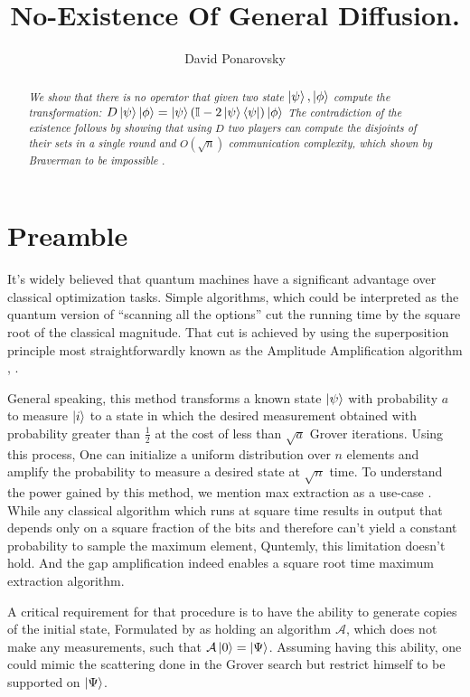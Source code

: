 \documentclass{article}
\begin{document}
\title{No-Existence Of General Diffusion.}
\author{David Ponarovsky}
\maketitle

\begin{abstract}\textit{We show that there is no operator that given two state $\ket{\psi},\ket{\phi}$ compute the transformation: $D \ket{\psi}\ket{\phi} = \ket{\psi}\left( \mathbb{I} - 2 \ket{\psi}\bra{\psi} \right)\ket{\phi} $ The contradiction of the existence follows by showing that using $D$ two players can compute the disjoints of their sets in a single round and $O\left( \sqrt{n} \right)$ communication complexity, which shown by Braverman to be impossible \cite{Braverman}. }
\end{abstract}

\section{Preamble} It's widely believed that quantum machines have a significant advantage over classical optimization tasks. Simple algorithms, which could be interpreted as the quantum version of ``scanning all the options'' cut the running time by the square root of the classical magnitude. That cut is achieved by using the superposition principle most straightforwardly known as the Amplitude Amplification algorithm \cite{Brassard_2002}, \cite{grover1996fast}. 

General speaking, this method transforms a known state $\ket{\psi}$  with probability $a$ to measure $\ket{i}$ to a state in which the desired measurement obtained with probability greater than $\frac{1}{2}$ at the cost of less than $\sqrt{a}$ Grover iterations. Using this process, One can initialize a uniform distribution over $n$ elements and amplify the probability to measure a desired state at $\sqrt{n}$ time. To understand the power gained by this method, we mention max extraction as a use-case \cite{ahuja1999quantum}. While any classical algorithm which runs at square time results in output that depends only on a square fraction of the bits and therefore can't yield a constant probability to sample the maximum element, Quntemly, this limitation doesn't hold. And the gap amplification indeed enables a square root time maximum extraction algorithm. 
  
  A critical requirement for that procedure is to have the ability to generate copies of the initial state, Formulated by \cite{Brassard_2002} as holding an algorithm $\mathcal{A}$, which does not make any measurements, such that $\mathcal{A}\ket{0}=\ket{\Psi}$. Assuming having this ability, one could mimic the scattering done in the Grover search but restrict himself to be supported on $\ket{\Psi}$. 
\end{document}
